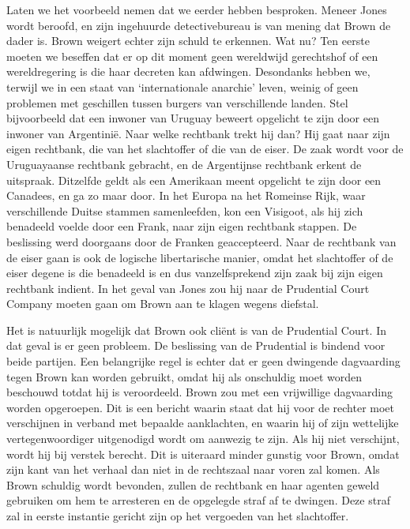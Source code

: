\documentclass[
  a5paper,
  smalldemyvopaper,10pt,twoside,onecolumn,openright,extrafontsizes,hidelinks]{memoir}
\begin{document}
Laten we het voorbeeld nemen dat we eerder hebben besproken. Meneer
Jones wordt beroofd, en zijn ingehuurde detectivebureau is van mening
dat Brown de dader is. Brown weigert echter zijn schuld te erkennen. Wat
nu? Ten eerste moeten we beseffen dat er op dit moment geen wereldwijd
gerechtshof of een wereldregering is die haar decreten kan afdwingen.
Desondanks hebben we, terwijl we in een staat van `internationale
anarchie' leven, weinig of geen problemen met geschillen tussen burgers
van verschillende landen. Stel bijvoorbeeld dat een inwoner van Uruguay
beweert opgelicht te zijn door een inwoner van Argentinië. Naar welke
rechtbank trekt hij dan? Hij gaat naar zijn eigen rechtbank, die van het
slachtoffer of die van de eiser. De zaak wordt voor de Uruguayaanse
rechtbank gebracht, en de Argentijnse rechtbank erkent de uitspraak.
Ditzelfde geldt als een Amerikaan meent opgelicht te zijn door een
Canadees, en ga zo maar door. In het Europa na het Romeinse Rijk, waar
verschillende Duitse stammen samenleefden, kon een Visigoot, als hij
zich benadeeld voelde door een Frank, naar zijn eigen rechtbank stappen.
De beslissing werd doorgaans door de Franken geaccepteerd. Naar de
rechtbank van de eiser gaan is ook de logische libertarische manier,
omdat het slachtoffer of de eiser degene is die benadeeld is en dus
vanzelfsprekend zijn zaak bij zijn eigen rechtbank indient. In het geval
van Jones zou hij naar de Prudential Court Company moeten gaan om Brown
aan te klagen wegens diefstal.

Het is natuurlijk mogelijk dat Brown ook cliënt is van de Prudential
Court. In dat geval is er geen probleem. De beslissing van de Prudential
is bindend voor beide partijen. Een belangrijke regel is echter dat er
geen dwingende dagvaarding tegen Brown kan worden gebruikt, omdat hij
als onschuldig moet worden beschouwd totdat hij is veroordeeld. Brown
zou met een vrijwillige dagvaarding worden opgeroepen. Dit is een
bericht waarin staat dat hij voor de rechter moet verschijnen in verband
met bepaalde aanklachten, en waarin hij of zijn wettelijke
vertegenwoordiger uitgenodigd wordt om aanwezig te zijn. Als hij niet
verschijnt, wordt hij bij verstek berecht. Dit is uiteraard minder
gunstig voor Brown, omdat zijn kant van het verhaal dan niet in de
rechtszaal naar voren zal komen. Als Brown schuldig wordt bevonden,
zullen de rechtbank en haar agenten geweld gebruiken om hem te
arresteren en de opgelegde straf af te dwingen. Deze straf zal in eerste
instantie gericht zijn op het vergoeden van het slachtoffer.
\end{document}
